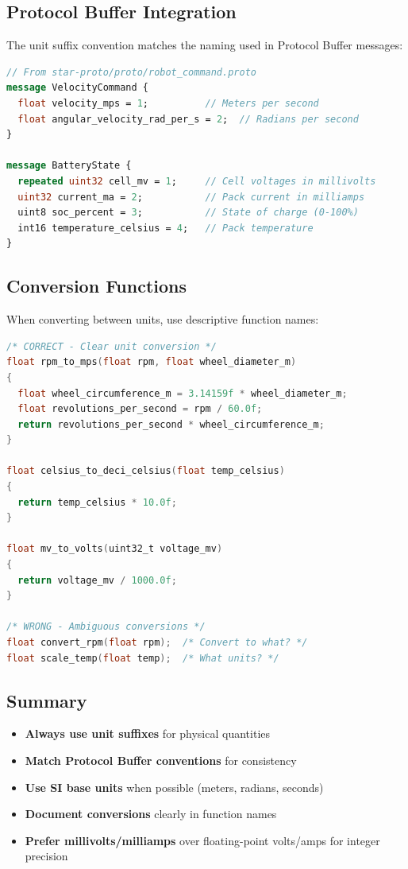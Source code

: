 \subsection{Protocol Buffer Integration}

The unit suffix convention matches the naming used in Protocol Buffer messages:

\begin{lstlisting}[language=proto]
// From star-proto/proto/robot_command.proto
message VelocityCommand {
  float velocity_mps = 1;          // Meters per second
  float angular_velocity_rad_per_s = 2;  // Radians per second
}

message BatteryState {
  repeated uint32 cell_mv = 1;     // Cell voltages in millivolts
  uint32 current_ma = 2;           // Pack current in milliamps
  uint8 soc_percent = 3;           // State of charge (0-100%)
  int16 temperature_celsius = 4;   // Pack temperature
}


\end{lstlisting}
\subsection{Conversion Functions}

When converting between units, use descriptive function names:

\begin{lstlisting}[language=C]
/* CORRECT - Clear unit conversion */
float rpm_to_mps(float rpm, float wheel_diameter_m)
{
  float wheel_circumference_m = 3.14159f * wheel_diameter_m;
  float revolutions_per_second = rpm / 60.0f;
  return revolutions_per_second * wheel_circumference_m;
}

float celsius_to_deci_celsius(float temp_celsius)
{
  return temp_celsius * 10.0f;
}

float mv_to_volts(uint32_t voltage_mv)
{
  return voltage_mv / 1000.0f;
}

/* WRONG - Ambiguous conversions */
float convert_rpm(float rpm);  /* Convert to what? */
float scale_temp(float temp);  /* What units? */


\end{lstlisting}
\subsection{Summary}

\begin{itemize}
\item \textbf{Always use unit suffixes} for physical quantities
\item \textbf{Match Protocol Buffer conventions} for consistency
\item \textbf{Use SI base units} when possible (meters, radians, seconds)
\item \textbf{Document conversions} clearly in function names
\item \textbf{Prefer millivolts/milliamps} over floating-point volts/amps for integer precision
\end{itemize}

